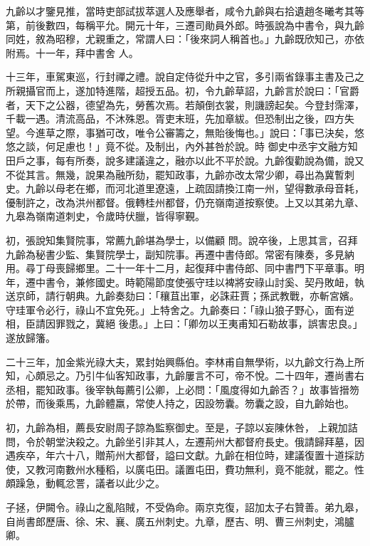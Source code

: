 \begin{pinyinscope}
 九齡以才鑒見推，當時吏部試拔萃選人及應舉者，咸令九齡與右拾遺趙冬曦考其等第，前後數四，每稱平允。開元十年，三遷司勛員外郎。時張說為中書令，與九齡同姓，敘為昭穆，尤親重之，常謂人曰：「後來詞人稱首也。」九齡既欣知己，亦依附焉。十一年，拜中書舍
 人。



 十三年，車駕東巡，行封禪之禮。說自定侍從升中之官，多引兩省錄事主書及己之所親攝官而上，遂加特進階，超授五品。初，令九齡草詔，九齡言於說曰：「官爵者，天下之公器，德望為先，勞舊次焉。若顛倒衣裳，則譏謗起矣。今登封霈澤，千載一遇。清流高品，不沐殊恩。胥吏末班，先加章紱。但恐制出之後，四方失望。今進草之際，事猶可改，唯令公審籌之，無貽後悔也。」說曰：「事已決矣，悠悠之談，何足慮也！」竟不從。及制出，內外甚咎於說。時
 御史中丞宇文融方知田戶之事，每有所奏，說多建議違之，融亦以此不平於說。九齡復勸說為備，說又不從其言。無幾，說果為融所劾，罷知政事，九齡亦改太常少卿，尋出為冀暫刺史。九齡以母老在鄉，而河北道里遼遠，上疏固請換江南一州，望得數承母音耗，優制許之，改為洪州都督。俄轉桂州都督，仍充嶺南道按察使。上又以其弟九章、九皋為嶺南道刺史，令歲時伏臘，皆得寧覲。



 初，張說知集賢院事，常薦九齡堪為學士，以備顧
 問。說卒後，上思其言，召拜九齡為秘書少監、集賢院學士，副知院事。再遷中書侍郎。常密有陳奏，多見納用。尋丁母喪歸鄉里。二十一年十二月，起復拜中書侍郎、同中書門下平章事。明年，遷中書令，兼修國史。時範陽節度使張守珪以裨將安祿山討奚、契丹敗衄，執送京師，請行朝典。九齡奏劾曰：「穰苴出軍，必誅莊賈；孫武教戰，亦斬宮嬪。守珪軍令必行，祿山不宜免死。」上特舍之。九齡奏曰：「祿山狼子野心，面有逆相，臣請因罪戮之，冀絕
 後患。」上曰：「卿勿以王夷甫知石勒故事，誤害忠良。」遂放歸籓。



 二十三年，加金紫光祿大夫，累封始興縣伯。李林甫自無學術，以九齡文行為上所知，心頗忌之。乃引牛仙客知政事，九齡屢言不可，帝不悅。二十四年，遷尚書右丞相，罷知政事。後宰執每薦引公卿，上必問：「風度得如九齡否？」故事皆搢笏於帶，而後乘馬，九齡體羸，常使人持之，因設笏囊。笏囊之設，自九齡始也。



 初，九齡為相，薦長安尉周子諒為監察御史。至是，子諒以妄陳休咎，
 上親加詰問，令於朝堂決殺之。九齡坐引非其人，左遷荊州大都督府長史。俄請歸拜墓，因遇疾卒，年六十八，贈荊州大都督，謚曰文獻。九齡在相位時，建議復置十道採訪使，又教河南數州水種稻，以廣屯田。議置屯田，費功無利，竟不能就，罷之。性頗躁急，動輒忿詈，議者以此少之。



 子拯，伊闕令。祿山之亂陷賊，不受偽命。兩京克復，詔加太子右贊善。弟九皋，自尚書郎歷唐、徐、宋、襄、廣五州刺史。九章，歷吉、明、曹三州刺史，鴻臚卿。




\end{pinyinscope}
